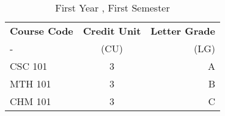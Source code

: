 \documentclass{article}
\begin{document}
\begin{table}[h!]
	\begin{center}
		\caption{First Year , First Semester}
		\label{tab:table1}
		\begin{tabular}{l|c|r}
			\textbf{Course Code} & \textbf{Credit Unit} &
			\textbf{Letter Grade}\\
			- & (CU) & (LG) \\
			\hline
			CSC 101 & 3 & A\\
			MTH 101 & 3 & B\\
			CHM 101 & 3 & C\\
			\end{tabular}
	\end{center}
\end{table}
\end{document}

